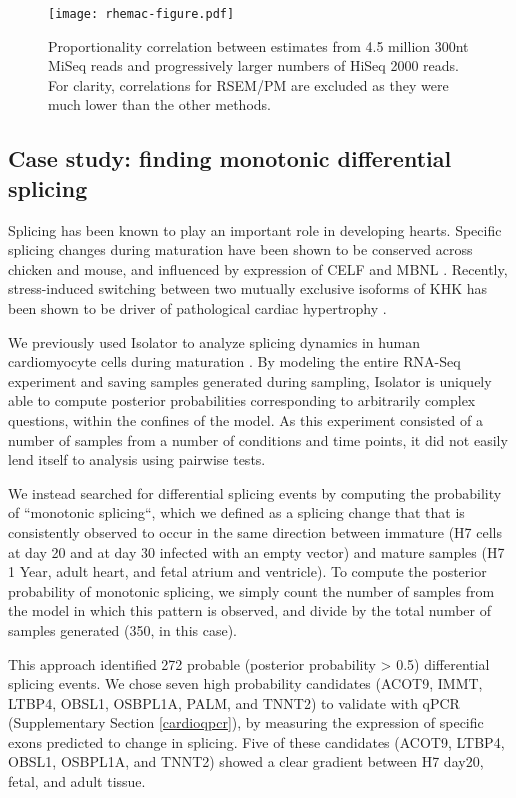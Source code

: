 \documentclass[twocolumn]{article}
\begin{document}
\begin{figure}
\texttt{[image: rhemac-figure.pdf]}
\caption{Proportionality correlation between estimates from 4.5 million 300nt
MiSeq reads and progressively larger numbers of HiSeq 2000 reads. For clarity,
correlations for RSEM/PM are excluded as they were much lower than the other
methods.}
\label{fig:rhemac}
\end{figure}

\subsection{Case study: finding monotonic differential splicing}\label{finding-monotonic-differential-splicing}

Splicing has been known to play an important role in developing hearts. Specific
splicing changes during maturation have been shown to be conserved across
chicken and mouse, and influenced by expression of CELF and MBNL
\cite{Kalsotra:2008ke}. Recently, stress-induced switching between two mutually
exclusive isoforms of KHK has been shown to be driver of pathological cardiac
hypertrophy \cite{Mirtschink:2015iq}.

We previously used Isolator to analyze splicing dynamics in human cardiomyocyte
cells during maturation \cite{Kuppusamy:2015ey}. By modeling the entire RNA-Seq
experiment and saving samples generated during sampling, Isolator is uniquely
able to compute posterior probabilities corresponding to arbitrarily complex
questions, within the confines of the model. As this experiment consisted of
a number of samples from a number of conditions and time points, it did not
easily lend itself to analysis using pairwise tests.

We instead searched for differential splicing events by computing the
probability of ``monotonic splicing``, which we defined as a splicing change
that that is consistently observed to occur in the same direction
between immature (H7 cells at day 20 and at day 30 infected with an empty
vector) and mature samples (H7 1 Year, adult heart, and fetal atrium and
ventricle). To compute the posterior probability of monotonic splicing, we
simply count the number of samples from the model in which this pattern is
observed, and divide by the total number of samples generated (350, in this
case).

This approach identified 272 probable (posterior probability > 0.5) differential
splicing events. We chose seven high probability candidates (ACOT9, IMMT, LTBP4,
OBSL1, OSBPL1A, PALM, and TNNT2) to validate with qPCR (Supplementary Section
\ref{cardioqpcr}), by measuring the expression of specific exons predicted to
change in splicing. Five of these candidates (ACOT9, LTBP4, OBSL1, OSBPL1A, and
TNNT2) showed a clear gradient between H7 day20, fetal, and adult tissue.
\end{document}
